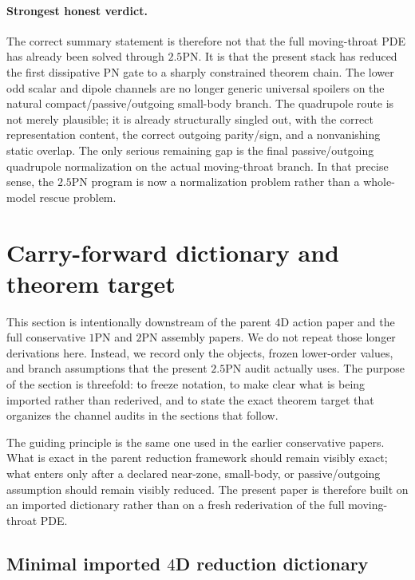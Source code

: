 \documentclass[11pt]{article}
\begin{document}
\paragraph{Strongest honest verdict.}
The correct summary statement is therefore not that the full moving-throat PDE
has already been solved through $2.5$PN.  It is that the present stack has
reduced the first dissipative PN gate to a sharply constrained theorem chain.
The lower odd scalar and dipole channels are no longer generic universal
spoilers on the natural compact/passive/outgoing small-body branch.  The
quadrupole route is not merely plausible; it is already structurally singled out,
with the correct representation content, the correct outgoing parity/sign, and a
nonvanishing static overlap.  The only serious remaining gap is the final
passive/outgoing quadrupole normalization on the actual moving-throat branch.
In that precise sense, the $2.5$PN program is now a normalization problem rather
than a whole-model rescue problem.

\section{Carry-forward dictionary and theorem target}
\label{sec:dictionary-target}

This section is intentionally downstream of the parent $4$D action paper and the
full conservative $1$PN and $2$PN assembly papers.  We do not repeat those
longer derivations here.  Instead, we record only the objects, frozen lower-order
values, and branch assumptions that the present $2.5$PN audit actually uses.
The purpose of the section is threefold: to freeze notation, to make clear what is
being imported rather than rederived, and to state the exact theorem target that
organizes the channel audits in the sections that follow.

The guiding principle is the same one used in the earlier conservative papers.
What is exact in the parent reduction framework should remain visibly exact;
what enters only after a declared near-zone, small-body, or passive/outgoing
assumption should remain visibly reduced.  The present paper is therefore built on
an imported dictionary rather than on a fresh rederivation of the full
moving-throat PDE.

\subsection{Minimal imported \texorpdfstring{$4$}{4}D reduction dictionary}
\label{sec:dictionary-target-4d}
\end{document}
